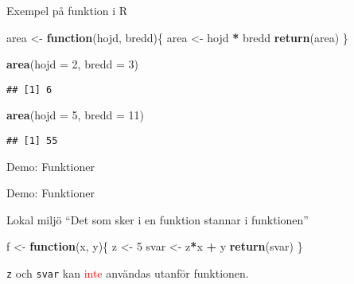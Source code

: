 \documentclass[
  10pt,
  ignorenonframetext,
]{beamer}
\newenvironment{Shaded}{\begin{snugshade}}{\end{snugshade}}
\newcommand{\AttributeTok}[1]{\textcolor[rgb]{0.13,0.29,0.53}{#1}}
\newcommand{\ControlFlowTok}[1]{\textcolor[rgb]{0.13,0.29,0.53}{\textbf{#1}}}
\newcommand{\DecValTok}[1]{\textcolor[rgb]{0.00,0.00,0.81}{#1}}
\newcommand{\FunctionTok}[1]{\textcolor[rgb]{0.13,0.29,0.53}{\textbf{#1}}}
\newcommand{\NormalTok}[1]{#1}
\newcommand{\OtherTok}[1]{\textcolor[rgb]{0.56,0.35,0.01}{#1}}
\newcommand{\SpecialCharTok}[1]{\textcolor[rgb]{0.81,0.36,0.00}{\textbf{#1}}}
\begin{document}
\begin{frame}[fragile]{Exempel på funktion i R}
\protect\hypertarget{exempel-puxe5-funktion-i-r}{}
\begin{Shaded}
\begin{Highlighting}[]
\NormalTok{area }\OtherTok{\textless{}{-}} \ControlFlowTok{function}\NormalTok{(hojd, bredd)\{}
\NormalTok{  area }\OtherTok{\textless{}{-}}\NormalTok{ hojd }\SpecialCharTok{*}\NormalTok{ bredd}
  \FunctionTok{return}\NormalTok{(area)}
\NormalTok{\}}
\end{Highlighting}
\end{Shaded}

\begin{Shaded}
\begin{Highlighting}[]
\FunctionTok{area}\NormalTok{(}\AttributeTok{hojd =} \DecValTok{2}\NormalTok{, }\AttributeTok{bredd =} \DecValTok{3}\NormalTok{)}
\end{Highlighting}
\end{Shaded}

\begin{verbatim}
## [1] 6
\end{verbatim}

\begin{Shaded}
\begin{Highlighting}[]
\FunctionTok{area}\NormalTok{(}\AttributeTok{hojd =} \DecValTok{5}\NormalTok{, }\AttributeTok{bredd =} \DecValTok{11}\NormalTok{)}
\end{Highlighting}
\end{Shaded}

\begin{verbatim}
## [1] 55
\end{verbatim}
\end{frame}

\begin{frame}{Demo: Funktioner}
\protect\hypertarget{demo-funktioner}{}
\begin{block}{Demo: Funktioner}
\protect\hypertarget{demo-funktioner-1}{}
\end{block}
\end{frame}

\begin{frame}[fragile]{Lokal miljö}
\protect\hypertarget{lokal-miljuxf6}{}
``Det som sker i en funktion stannar i funktionen''

\begin{Shaded}
\begin{Highlighting}[]
\NormalTok{f }\OtherTok{\textless{}{-}} \ControlFlowTok{function}\NormalTok{(x, y)\{}
\NormalTok{  z }\OtherTok{\textless{}{-}} \DecValTok{5}
\NormalTok{  svar }\OtherTok{\textless{}{-}}\NormalTok{ z}\SpecialCharTok{*}\NormalTok{x }\SpecialCharTok{+}\NormalTok{ y }
  \FunctionTok{return}\NormalTok{(svar)}
\NormalTok{\}}
\end{Highlighting}
\end{Shaded}

\texttt{z} och \texttt{svar} kan \textcolor{red}{inte} användas utanför
funktionen.
\end{frame}
\end{document}
